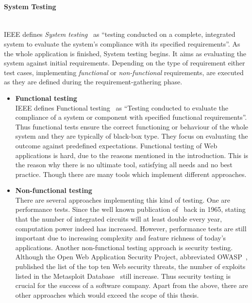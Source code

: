 \documentclass[12pt, notitlepage]{article}
\begin{document}
\paragraph{System Testing} ~\\
IEEE defines \textit{System testing}~\cite{ieee-definition} as \enquote{testing conducted on a complete, integrated system to evaluate the system's compliance with its specified requirements}. As the whole application is finished, System testing begins. It aims as evaluating the system against initial requirements.
Depending on the type of requirement either test cases, implementing \textit{functional} or \textit{non-functional} requirements, are executed as they are defined during the requirement-gathering phase. 
\begin{itemize}
	\item \textbf{Functional testing}\\
	IEEE defines Functional testing~\cite{ieee-definition} as
	\enquote{Testing conducted to evaluate the compliance of a system or component with specified functional requirements}. Thus functional tests ensure
	the correct functioning or behaviour of the whole system and they are typically of black-box type.
	They focus on evaluating the outcome against predefined expectations. Functional testing of Web applications is hard, due to the
	reasons mentioned in the introduction. This is the reason why there is no ultimate tool, satisfying all needs and no best practice. Though there are many
	tools which implement different approaches.
	\item \textbf{Non-functional testing}\\
	There are several approaches implementing this kind of testing. One are performance tests. Since the well known publication of~\citet{moore} back in 
	1965, stating that the number of integrated circuits will at least double every year, computation power indeed has increased.
	However, performance tests are still important due to increasing complexity and feature richness of today’s applications. Another non-functional 
	testing approach is security testing. Although the Open Web Application Security Project, abbreviated OWASP~\cite{owasp}, published the list of the top ten
	Web security threats, the number of exploits listed in the Metasploit Database~\cite{metasploit} still increase. Thus security testing is crucial for the success
	of a software company. Apart from the above, there are other approaches which would exceed the scope of this thesis. 
\end{itemize}
\end{document}
